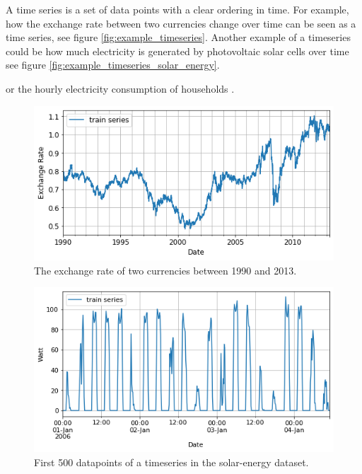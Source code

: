 


\graphicspath{{2_background/figures/}}
A time series is a set of data points with a clear ordering in time. For example, how the exchange rate between two currencies change over time can be seen as a time series, see figure \ref{fig:example_timeseries}. Another example of a timeseries could be how much electricity is generated by photovoltaic solar cells over time see figure \ref{fig:example_timeseries_solar_energy}.

or the hourly electricity consumption of households \cite{gluonts_paper}.

\begin{figure}[htb]
    \centering
        \includegraphics[width=\linewidth]{2_background/figures/exchange_rate_example.png}
            \caption{The exchange rate of two currencies between 1990 and 2013.}
    \endminipage\hfill
\end{figure}
\label{fig:example_timeseries}

\begin{figure}[htb]
    \centering
        \includegraphics[width=\linewidth]{2_background/figures/solar_energy_zoomed_timeseries_3.png}
        \caption{First 500 datapoints of a timeseries in the solar-energy dataset.}
    \endminipage\hfill
\end{figure}
\label{fig:example_timeseries_solar_energy}

